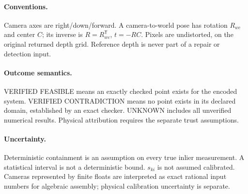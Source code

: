 \documentclass[11pt]{article}
\begin{document}
\paragraph{Conventions.}
Camera axes are right/down/forward. A camera-to-world pose has rotation $R_{wc}$ and center $C$; its inverse is $R=R_{wc}^{\mathsf T}$, $t=-RC$. Pixels are undistorted, on the original returned depth grid. Reference depth is never part of a repair or detection input.
\paragraph{Outcome semantics.}
VERIFIED FEASIBLE means an exactly checked point exists for the encoded system. VERIFIED CONTRADICTION means no point exists in its declared domain, established by an exact checker. UNKNOWN includes all unverified numerical results. Physical attribution requires the separate trust assumptions.
\paragraph{Uncertainty.}
Deterministic containment is an assumption on every true inlier measurement. A statistical interval is not a deterministic bound. $s_{ki}$ is not assumed calibrated. Cameras represented by finite floats are interpreted as exact rational input numbers for algebraic assembly; physical calibration uncertainty is separate.
\end{document}
